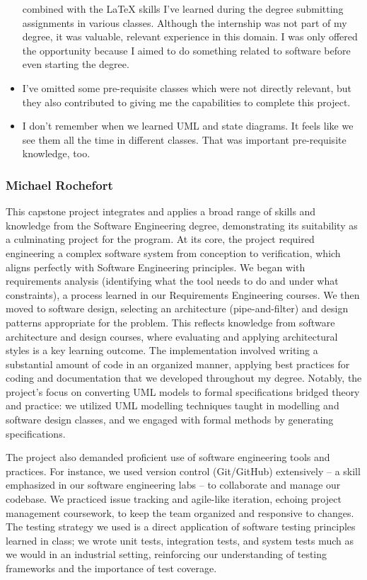 \begin{itemize}
    combined with the LaTeX skills I've learned during the degree submitting assignments in various classes.
    Although the internship was not part of my degree, it was valuable, relevant experience in this domain.
    I was only offered the opportunity because I aimed to do something related to software before even starting the degree.
    \item I've omitted some pre-requisite classes which were not directly relevant,
    but they also contributed to giving me the capabilities to complete this project.
    \item I don't remember when we learned UML and state diagrams.
    It feels like we see them all the time in different classes.
    That was important pre-requisite knowledge, too.
\end{itemize}


\subsubsection{Michael Rochefort}\label{subsubsec:mike-deg}

This capstone project integrates and applies a broad range of skills and knowledge from the Software Engineering degree, demonstrating its suitability as a culminating project for the program. At its core, the project required engineering a complex software system from conception to verification, which aligns perfectly with Software Engineering principles. We began with requirements analysis (identifying what the tool needs to do and under what constraints), a process learned in our Requirements Engineering courses. We then moved to software design, selecting an architecture (pipe-and-filter) and design patterns appropriate for the problem. This reflects knowledge from software architecture and design courses, where evaluating and applying architectural styles is a key learning outcome. The implementation involved writing a substantial amount of code in an organized manner, applying best practices for coding and documentation that we developed throughout my degree. Notably, the project’s focus on converting UML models to formal specifications bridged theory and practice: we utilized UML modelling techniques taught in modelling and software design classes, and we engaged with formal methods by generating specifications.

The project also demanded proficient use of software engineering tools and practices. For instance, we used version control (Git/GitHub) extensively – a skill emphasized in our software engineering labs – to collaborate and manage our codebase. We practiced issue tracking and agile-like iteration, echoing project management coursework, to keep the team organized and responsive to changes. The testing strategy we used is a direct application of software testing principles learned in class; we wrote unit tests, integration tests, and system tests much as we would in an industrial setting, reinforcing our understanding of testing frameworks and the importance of test coverage.

